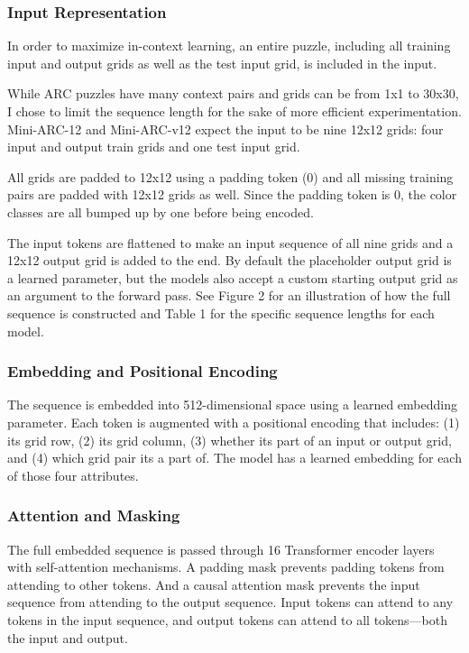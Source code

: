 \documentclass[10pt,twocolumn]{article}
\begin{document}
\subsubsection{Input Representation}

In order to maximize in-context learning, an entire puzzle, including
all training input and output grids as well as the test input grid,
is included in the input.

While ARC puzzles have many context pairs and grids can be from 1x1
to 30x30, I chose to limit the sequence length for the sake of
more efficient experimentation. Mini-ARC-12 and Mini-ARC-v12 expect the input
to be nine 12x12 grids: four input and output train grids and one
test input grid.

All grids are padded to 12x12 using a padding token (0) and all
missing training pairs are padded with 12x12 grids as well. Since the
padding token is 0, the color classes are all bumped up by one before
being encoded.

The input tokens are flattened to make an input sequence of all nine
grids and a 12x12 output grid is added to the end. By default the
placeholder output grid is a learned parameter, but the models also
accept a custom starting output grid as an argument to the forward
pass. See Figure 2 for an illustration of how the full sequence is
constructed and Table 1 for the specific sequence lengths for each model.

\subsubsection{Embedding and Positional Encoding}
The sequence is embedded into 512-dimensional space using a
learned embedding parameter. Each token is augmented with a
positional encoding that includes: (1) its grid row, (2) its grid
column, (3) whether its part of an input or output grid, and (4)
which grid pair its a part of. The model has a learned embedding for
each of those four attributes.

\subsubsection{Attention and Masking}
The full embedded sequence is passed through 16 Transformer encoder
layers with self-attention mechanisms. A padding mask prevents
padding tokens from attending to other tokens. And a causal attention
mask prevents the input sequence from attending to the output
sequence. Input tokens can attend to any tokens in the input
sequence, and output tokens can attend to all tokens—both the input and output.
\end{document}
